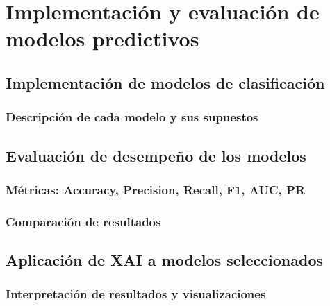 

\chapter{Implementación y evaluación de modelos predictivos}

\section{Implementación de modelos de clasificación}
\subsection{Descripción de cada modelo y sus supuestos}
\section{Evaluación de desempeño de los modelos}
\subsection{Métricas: Accuracy, Precision, Recall, F1, AUC, PR}
\subsection{Comparación de resultados}
\section{Aplicación de XAI a modelos seleccionados}
\subsection{Interpretación de resultados y visualizaciones}